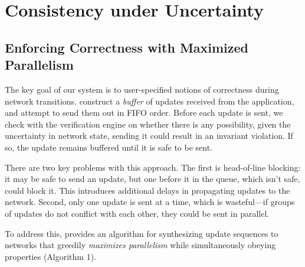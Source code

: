 
\section{Consistency under Uncertainty}


\subsection{Enforcing Correctness with  Maximized Parallelism}
\label{sec:parallelism}

The key goal of our system is to 
user-specified notions of correctness during network transitions.   construct a {\em buffer} of updates received from the application,
and attempt to send them out in FIFO order. Before each update is sent, we check with the
verification engine on whether there is any possibility, given the uncertainty in network state,  sending it could result in an invariant violation. If so, the update remains buffered until it is safe to be sent.

There are two key problems with this approach.
The first is head-of-line blocking: it may be safe to send an update, but one before it in the queue, which isn't safe, could block it. This introduces additional delays in propagating updates
to the network.
Second, only one update is sent at a time, which is wasteful---if groups of updates do not conflict with each other, they could be sent in parallel.

To address this,
\name provides an algorithm for synthesizing update sequences to networks that greedily {\em maximizes parallelism} while
simultaneously obeying  properties
(Algorithm 1).%


